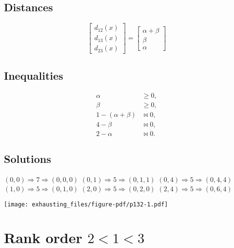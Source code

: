 \documentclass[
  12pt,
  letterpaper,
  DIV=11,
  numbers=noendperiod]{scrartcl}
\begin{document}
\subsection{Distances}\label{distances-1}

\[
\begin{bmatrix}
d_{12}(x)\\
d_{13}(x)\\
d_{23}(x)
\end{bmatrix}
=
\begin{bmatrix}
\alpha+\beta\\
\beta\\
\alpha
\end{bmatrix}
\]

\subsection{Inequalities}\label{inequalities-1}

\begin{align}
\alpha&\geq 0,\\
\beta&\geq 0,\\
1-(\alpha+\beta)&\bowtie 0,\\
4-\beta&\bowtie 0,\\
2-\alpha&\bowtie 0.
\end{align}

\subsection{Solutions}\label{solutions-1}

\((0,0)\Rightarrow 7\Rightarrow(0,0,0)\)\newline
\((0,1)\Rightarrow 5\Rightarrow(0,1,1)\)\newline
\((0,4)\Rightarrow 5\Rightarrow(0,4,4)\)\newline
\((1,0)\Rightarrow 5\Rightarrow(0,1,0)\)\newline
\((2,0)\Rightarrow 5\Rightarrow(0,2,0)\)\newline
\((2,4)\Rightarrow 5\Rightarrow(0,6,4)\)\newline

\begin{center}
\texttt{[image: exhausting\_files/figure-pdf/p132-1.pdf]}
\end{center}

\pagebreak

\section{\texorpdfstring{Rank order
\(2<1<3\)}{Rank order 2\textless1\textless3}}\label{rank-order-213}
\end{document}
